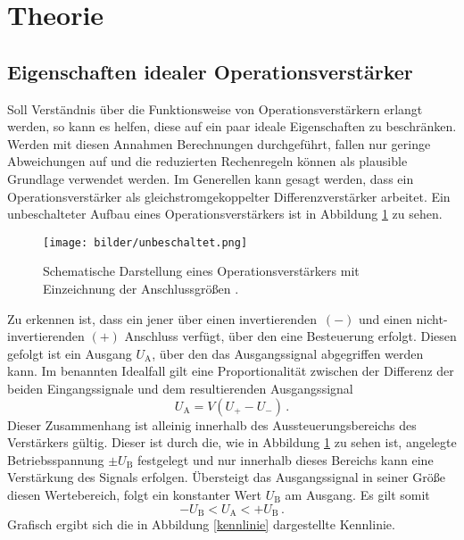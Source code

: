 \section{Theorie}\label{theorie}
\subsection{Eigenschaften idealer Operationsverstärker}
Soll Verständnis über die Funktionsweise von Operationsverstärkern erlangt werden, so kann es helfen, diese auf ein paar ideale Eigenschaften zu beschränken. Werden mit diesen Annahmen Berechnungen durchgeführt, fallen nur geringe Abweichungen auf und die reduzierten Rechenregeln können als plausible Grundlage verwendet werden.
Im Generellen kann gesagt werden, dass ein Operationsverstärker als gleichstromgekoppelter Differenzverstärker arbeitet.
Ein unbeschalteter Aufbau eines Operationsverstärkers ist in Abbildung \ref{unbeschaltet} zu sehen.

\begin{figure}[H]
  \centering
  \texttt{[image: bilder/unbeschaltet.png]}
  \caption{Schematische Darstellung eines Operationsverstärkers mit Einzeichnung der Anschlussgrößen \cite{anleitung}.}
  \label{unbeschaltet}
\end{figure}

Zu erkennen ist, dass ein jener über einen invertierenden~$(-)$  und einen nicht-invertierenden $(+)$  Anschluss verfügt, über den eine Besteuerung erfolgt. Diesen gefolgt ist ein Ausgang $U_\text{A}$, über den das Ausgangssignal abgegriffen werden kann.
Im benannten Idealfall gilt eine Proportionalität zwischen der Differenz der beiden Eingangssignale und dem resultierenden Ausgangssignal
\begin{equation}
  U_\text{A}=V(U_+-U_-)\,.
\end{equation}
Dieser Zusammenhang ist alleinig innerhalb des Aussteuerungsbereichs des Verstärkers gültig. Dieser ist durch die, wie in Abbildung \ref{unbeschaltet} zu sehen ist, angelegte Betriebsspannung $\pm U_\text{B}$ festgelegt und nur innerhalb dieses Bereichs kann eine Verstärkung des Signals erfolgen. Übersteigt das Ausgangssignal in seiner Größe diesen Wertebereich, folgt ein konstanter Wert $U_\text{B}$ am Ausgang.
Es gilt somit
\begin{equation}
  -U_\text{B} < U_\text{A} < +U_\text{B}\,.
\end{equation}
Grafisch ergibt sich die in Abbildung \ref{kennlinie} dargestellte Kennlinie.

